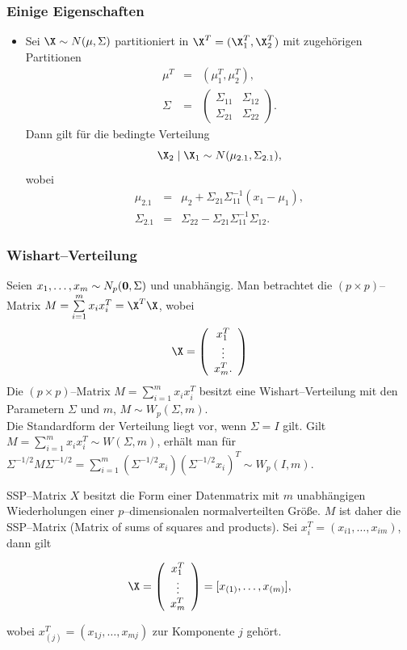 \begin{frame}\frametitle{Einige Eigenschaften}
\begin{itemize}
\item Sei $\X\sim N(\mu,\Sigma)$ partitioniert in $\X^T =
(\X^T_1,\X^T_2)$ mit zugeh\"{o}rigen Partitionen
\begin{eqnarray*}%
  \mu^T & = & (\mu^T_1, \mu^T_2),\\
  \Sigma & = &
\left(
  \begin{array}{cc}
    \Sigma_{11} & \Sigma_{12}\\
    \Sigma_{21} & \Sigma_{22}
  \end{array}
\right).
\end{eqnarray*}
Dann gilt f\"{u}r die bedingte Verteilung
\[
\X_2\mid \X_1\sim N(\mu_{2.1},\Sigma_{2.1}),
\]
wobei
\begin{eqnarray*}%
\mu_{2.1} & = & \mu_2 + \Sigma_{21}\Sigma_{11}^{-1} (x_1 - \mu_1),\\
\Sigma_{2.1} & = & \Sigma_{22} -
\Sigma_{21}\Sigma_{11}^{-1}\Sigma_{12}.
\end{eqnarray*}
\end{itemize}
\end{frame}

\begin{frame}\frametitle{Wishart--Verteilung}
Seien $x_1,\ldots,x_m\sim N_p({\bf 0},\Sigma)$ und unabh\"{a}ngig.
Man betrachtet die $(p\times p)$--Matrix $M = \sum\limits^m_{i=1}x_i
x_i^T = \X^T \X$, wobei
\[
\X=\left(
\begin{array}{c}
x^T_1\\
\vdots\\
x^T_m.
\end{array}
\right)
\]
Die $(p\times p)$--Matrix $M = \sum\limits^m_{i=1}x_ix_i^T$ besitzt
eine Wishart--Verteilung mit den Parametern $\Sigma$ und $m$, $M\sim
W_p(\Sigma,m)$.
\\Die Standardform der Verteilung liegt
vor, wenn $\Sigma = I$ gilt. Gilt $M =
\sum\limits^m_{i=1}x_ix_i^T\sim W(\Sigma,m)$, erh\"{a}lt man f\"{u}r
$\Sigma^{-1/2}M\Sigma^{-1/2} = \sum\limits^m_{i=1}(\Sigma^{-1/2}x_i)
(\Sigma^{-1/2}x_i)^T \sim W_p(I,m)$.
\end{frame}



\begin{frame}{SSP--Matrix}
$X$ besitzt die Form einer Datenmatrix mit $m$ unabh\"{a}ngigen
Wiederholungen einer $p$--dimensionalen nor\-mal\-ver\-teil\-ten
Gr\"{o}{\ss}e. $M$ ist daher die SSP--Matrix (Matrix of sums of
squares and products). Sei $x^T_i = (x_{i1},\ldots,x_{im})$, dann
gilt

\[
\X=\left(
\begin{array}{c}
x_1^T\\
\vdots\\x^T_m
\end{array}
\right)=[x_{(1)},\ldots,x_{(m)}],
\]

wobei $x_{(j)}^T = (x_{1j},\ldots,x_{mj})$ zur Komponente $j$
geh\"{o}rt.
\end{frame}


